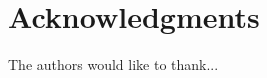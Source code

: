 \documentclass[10pt,a4paper]{article}
\newcommand\1{\vec 1}
\begin{document}
% 
% 
% 
% 
% 
% 
% 
% 
% 


% 
\section{Acknowledgments}

The authors would like to thank...




\end{document}
